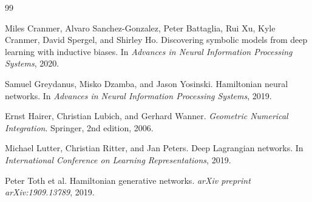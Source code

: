 \documentclass[11pt,a4paper]{article}
\begin{document}

\begin{thebibliography}{99}

Miles Cranmer, Alvaro Sanchez-Gonzalez, Peter Battaglia, Rui Xu, Kyle Cranmer, David Spergel, and Shirley Ho.
\newblock Discovering symbolic models from deep learning with inductive biases.
\newblock In \emph{Advances in Neural Information Processing Systems}, 2020.

Samuel Greydanus, Misko Dzamba, and Jason Yosinski.
\newblock Hamiltonian neural networks.
\newblock In \emph{Advances in Neural Information Processing Systems}, 2019.

Ernst Hairer, Christian Lubich, and Gerhard Wanner.
\newblock \emph{Geometric Numerical Integration}.
\newblock Springer, 2nd edition, 2006.

Michael Lutter, Christian Ritter, and Jan Peters.
\newblock Deep Lagrangian networks.
\newblock In \emph{International Conference on Learning Representations}, 2019.

Peter Toth et al.
\newblock Hamiltonian generative networks.
\newblock \emph{arXiv preprint arXiv:1909.13789}, 2019.

\end{thebibliography}
\end{document}
